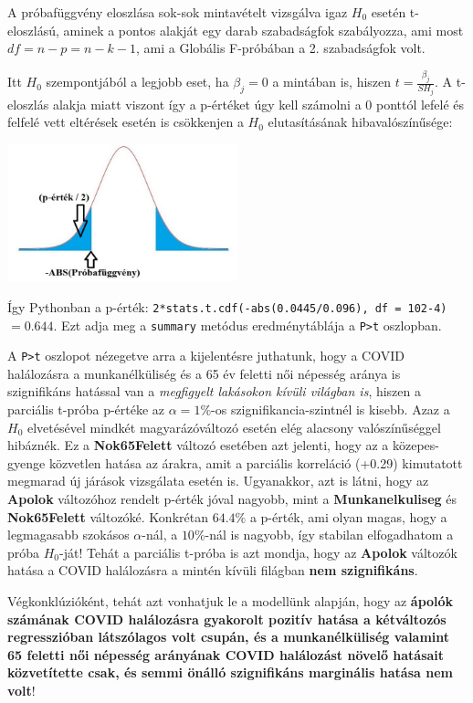 \documentclass[
]{book}
\begin{document}
A próbafüggvény eloszlása sok-sok mintavételt vizsgálva igaz \(H_0\) esetén t-eloszlású, aminek a pontos alakját egy darab szabadságfok szabályozza, ami most \(df=n-p=n-k-1\), ami a Globális F-próbában a 2. szabadságfok volt.

Itt \(H_0\) szempontjából a legjobb eset, ha \(\beta_j=0\) a mintában is, hiszen \(t=\frac{\beta_j}{SH_j}\). A t-eloszlás alakja miatt viszont így a p-értéket úgy kell számolni a 0 ponttól lefelé és felfelé vett eltérések esetén is csökkenjen a \(H_0\) elutasításának hibavalószínűsége:

\includegraphics[width=0.5\textwidth,height=\textheight]{pt.jpg}

Így Pythonban a p-érték: \texttt{2*stats.t.cdf(-abs(0.0445/0.096),\ df\ =\ 102-4)}\(= 0.644\). Ezt adja meg a \texttt{summary} metódus eredménytáblája a \texttt{P\textgreater{}\textbar{}t\textbar{}} oszlopban.

A \texttt{P\textgreater{}\textbar{}t\textbar{}} oszlopot nézegetve arra a kijelentésre juthatunk, hogy a COVID halálozásra a munkanélküliség és a 65 év feletti női népesség aránya is szignifikáns hatással van a \emph{megfigyelt lakásokon kívüli világban is}, hiszen a parciális t-próba p-értéke az \(\alpha=1\%\)-os szignifikancia-szintnél is kisebb. Azaz a \(H_0\) elvetésével mindkét magyarázóváltozó esetén elég alacsony valószínűséggel hibáznék. Ez a \textbf{Nok65Felett} változó esetében azt jelenti, hogy az a közepes-gyenge közvetlen hatása az árakra, amit a parciális korreláció (+0.29) kimutatott megmarad új járások vizsgálata esetén is. Ugyanakkor, azt is látni, hogy az \textbf{Apolok} változóhoz rendelt p-érték jóval nagyobb, mint a \textbf{Munkanelkuliseg} és \textbf{Nok65Felett} változóké. Konkrétan \(64.4\%\) a p-érték, ami olyan magas, hogy a legmagasabb szokásos \(\alpha\)-nál, a \(10\%\)-nál is nagyobb, így stabilan elfogadhatom a próba \(H_0\)-ját! Tehát a parciális t-próba is azt mondja, hogy az \textbf{Apolok} változók hatása a COVID halálozásra a mintén kívüli filágban \textbf{nem szignifikáns}.

Végkonklúzióként, tehát azt vonhatjuk le a modellünk alapján, hogy az \textbf{ápolók számának COVID halálozásra gyakorolt pozitív hatása a kétváltozós regresszióban látszólagos volt csupán, és a munkanélküliség valamint 65 feletti női népesség arányának COVID halálozást növelő hatásait közvetítette csak, és semmi önálló szignifikáns marginális hatása nem volt}!
\end{document}
